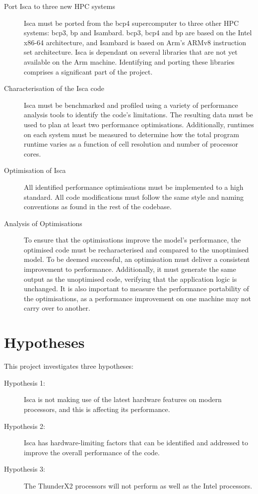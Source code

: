 \documentclass[a4paper,11pt]{report}
\begin{document}
\begin{description}
	\item[Port Isca to three new HPC systems] Isca must be ported from the \gls{bcp4} supercomputer to three other HPC systems: \gls{bcp3}, \gls{bp} and Isambard. \gls{bcp3}, \gls{bcp4} and \gls{bp} are based on the Intel x86-64 architecture, and Isambard is based on Arm's ARMv8 instruction set architecture. Isca is dependant on several libraries that are not yet available on the Arm machine. Identifying and porting these libraries comprises a significant part of the project.
	\item[Characterisation of the Isca code] Isca must be benchmarked and profiled using a variety of performance analysis tools to identify the code’s limitations. The resulting data must be used to plan at least two performance optimisations. Additionally, runtimes on each system must be measured to determine how the total program runtime varies as a function of cell resolution and number of processor cores. 
	
	\item[Optimisation of Isca] All identified performance optimisations must be implemented to a high standard. All code modifications must follow the same style and naming conventions as found in the rest of the codebase.
	
	\item[Analysis of Optimisations] To ensure that the optimisations improve the model’s performance, the optimised code must be recharacterised and compared to the unoptimised model. To be deemed successful, an optimisation must deliver a consistent improvement to performance. Additionally, it must generate the same output as the unoptimised code, verifying that the application logic is unchanged. It is also important to measure the performance portability of the optimisations, as a performance improvement on one machine may not carry over to another.
	
\end{description}

\section{Hypotheses}
This project investigates three hypotheses:

\begin{description}
\item[Hypothesis 1: ] Isca is not making use of the latest hardware features on modern processors, and this is affecting its performance. 

\item[Hypothesis 2: ] Isca has hardware-limiting factors that can be identified and addressed to improve the overall performance of the code.

\item[Hypothesis 3: ] The ThunderX2 processors will not perform as well as the Intel processors.
\end{description}
\end{document}
